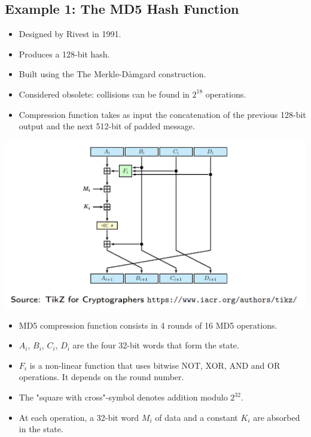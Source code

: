 	\subsection{Example 1: The MD5 Hash Function}
		\begin{itemize}
			\item Designed by Rivest in 1991.
			\item Produces a 128-bit hash.
			\item Built using the The Merkle-Dåmgard construction.
			\item Considered obsolete: collisions can be found in $2^{18}$ operations.
			\item Compression function takes as input the concatenation of the previous 128-bit output and the next 512-bit of padded message.
		\end{itemize}
	   	\begin{center}
			\includegraphics[width=140mm]{Graphics/Hash Functions/hf7.png}
		\end{center}
		\begin{itemize}
			\item MD5 compression function consists in 4 rounds of 16 MD5 operations.
			\item $A_i$, $B_i$, $C_i$, $D_i$ are the four 32-bit words that form the state.
			\item $F_i$ is a non-linear function that uses bitwise NOT, XOR, AND and OR operations. It depends on the round number.
			\item The "square with cross"-symbol denotes addition modulo $2^{32}$.
			\item At each operation, a 32-bit word $M_i$ of data and a constant $K_i$ are absorbed in the state.
		\end{itemize}
	
